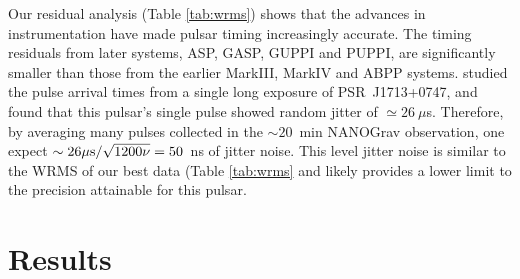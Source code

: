 Our residual analysis (Table \ref{tab:wrms}) shows that the advances in
instrumentation have made pulsar timing increasingly accurate.
The timing residuals from later systems, ASP, GASP, GUPPI and PUPPI, are
significantly smaller than those from the earlier MarkIII, MarkIV and ABPP
systems.
\citet{sc12} studied the pulse arrival times from a single long exposure of
PSR~J1713+0747, and found that this pulsar's single pulse showed random jitter of
$\simeq26~\mu$s. Therefore, by averaging many pulses collected in the
$\sim20$~min NANOGrav observation, one expect $\sim26\mu{\rm s}/\sqrt{1200\nu}=50$~ns of jitter noise. 
This level jitter noise is similar to the WRMS of our best data (Table
\ref{tab:wrms} and likely provides a lower limit to the precision attainable
for this pulsar.


\section{Results}
\label{sec:res}

